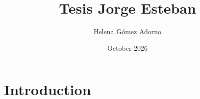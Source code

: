 \documentclass{article}
\title{Tesis Jorge Esteban}
\author{Helena Gómez Adorno}
\date{October 2026}
\begin{document}
\maketitle

\section{Introduction}
\end{document}
